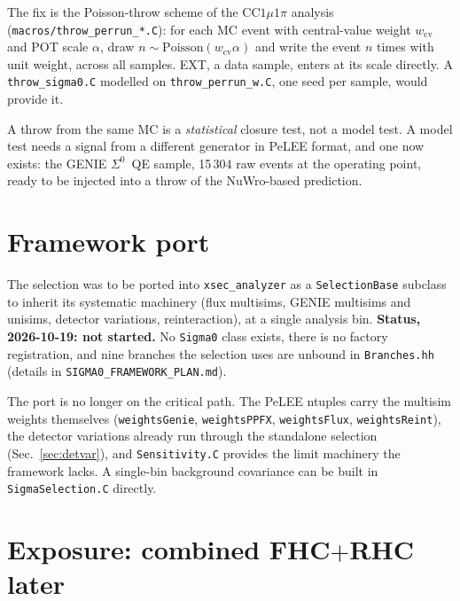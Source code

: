 \documentclass[11pt,a4paper]{article}
\newcommand{\Szero}{\ensuremath{\Sigma^{0}}}
\begin{document}
The fix is the Poisson-throw scheme of the CC$1\mu1\pi$ analysis
(\texttt{macros/throw\_perrun\_*.C}): for each MC event with central-value weight
$w_{\mathrm{cv}}$ and POT scale $\alpha$, draw $n \sim \mathrm{Poisson}(w_{\mathrm{cv}}
\alpha)$ and write the event $n$ times with unit weight, across all samples. EXT, a data
sample, enters at its scale directly. A \texttt{throw\_sigma0.C} modelled on
\texttt{throw\_perrun\_w.C}, one seed per sample, would provide it.

A throw from the same MC is a \emph{statistical} closure test, not a model test. A
model test needs a signal from a different generator in PeLEE format, and one now
exists: the GENIE \Szero\ QE sample, 15\,304 raw events at the operating point, ready
to be injected into a throw of the NuWro-based prediction.

\section{Framework port}
\label{sec:port}

The selection was to be ported into \texttt{xsec\_analyzer} as a
\texttt{SelectionBase} subclass to inherit its systematic machinery (flux multisims,
GENIE multisims and unisims, detector variations, reinteraction), at a single analysis
bin. \textbf{Status, 2026-10-19: not started.} No \texttt{Sigma0} class exists, there
is no factory registration, and nine branches the selection uses are unbound in
\texttt{Branches.hh} (details in \texttt{SIGMA0\_FRAMEWORK\_PLAN.md}).

The port is no longer on the critical path. The PeLEE ntuples carry the multisim
weights themselves (\texttt{weightsGenie}, \texttt{weightsPPFX}, \texttt{weightsFlux},
\texttt{weightsReint}), the detector variations already run through the standalone
selection (Sec.~\ref{sec:detvar}), and \texttt{Sensitivity.C} provides the limit
machinery the framework lacks. A single-bin background covariance can be built in
\texttt{SigmaSelection.C} directly.

\section{Exposure: combined FHC$+$RHC later}
\label{sec:exposure}
\end{document}
